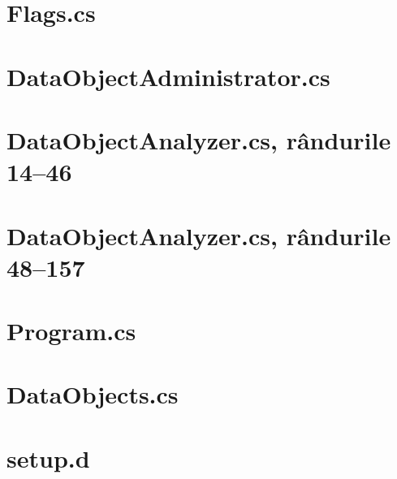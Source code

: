 \documentclass[a4paper,12pt]{report}
\begin{document}
\chapter{Flags.cs}\label{appendix:uni_thesis____examples_flags_Generated_Flags}


\chapter{DataObjectAdministrator.cs}\label{appendix:Kari____Kari_source_Kari_Plugins_DataObject_DataObjectAdministrator}


\chapter{DataObjectAnalyzer.cs, rândurile 14--46}\label{appendix:Kari____Kari_source_Kari_Plugins_DataObject_DataObjectAnalyzer_14_46}


\chapter{DataObjectAnalyzer.cs, rândurile 48--157}\label{appendix:Kari____Kari_source_Kari_Plugins_DataObject_DataObjectAnalyzer_48_157}


\chapter{Program.cs}\label{appendix:uni_thesis____examples_dataobject_Program}


\chapter{DataObjects.cs}\label{appendix:uni_thesis____examples_dataobject_Generated_DataObjects}


\chapter{setup.d}\label{appendix:race____race_dev_cli_source_commands_setup}

\end{document}
